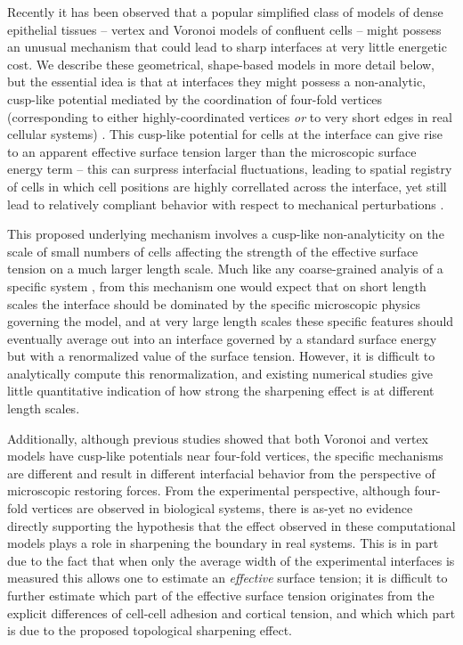 \documentclass[twoside,twocolumn,9pt]{article}
\begin{document}
Recently it has been observed that a popular simplified class of models of dense epithelial tissues  -- vertex and Voronoi models of confluent cells \cite{honda1983geometrical,bi2016motility,alt2017vertex} -- might possess an unusual mechanism that could lead to sharp interfaces at very little energetic cost. We describe these geometrical, shape-based models in more detail below, but the essential idea is that at interfaces they might possess a non-analytic, cusp-like potential mediated by the coordination of four-fold vertices (corresponding to either highly-coordinated vertices \emph{or} to very short edges in real cellular systems) \cite{sussman2018soft}. This cusp-like potential for cells at the interface can give rise to an apparent effective surface tension larger than the microscopic surface energy term -- this can surpress interfacial fluctuations, leading to spatial registry of cells in which cell positions are highly correllated across the interface, yet still lead to relatively compliant behavior with respect to mechanical perturbations \cite{sussman2018soft, sahu2021geometric, lawson2024differences}.

This proposed underlying mechanism involves a cusp-like non-analyticity on the scale of small numbers of cells affecting the strength of the effective surface tension on a much larger length scale. Much like any coarse-grained analyis of a specific system \cite{kardar2007statistical}, from this mechanism one would expect that on short length scales the interface should be dominated by the specific microscopic physics governing the model, and at very large length scales these specific features should eventually average out into an interface governed by a standard surface energy but with a renormalized value of the surface tension. However, it is difficult to analytically compute this renormalization, and existing numerical studies give little quantitative indication of how strong the sharpening effect is at different length scales. 

Additionally, although previous studies showed that both Voronoi and vertex models have cusp-like potentials near four-fold vertices, the specific mechanisms are different and result in different interfacial behavior from the perspective of microscopic restoring forces\cite{lawson2024differences}. From the experimental perspective, although four-fold vertices are observed in biological systems, there is as-yet no evidence directly supporting the hypothesis that the effect observed in these computational  models plays a role in sharpening the boundary in real systems. This is in part due to the fact that when only the average width of the experimental interfaces is measured this allows one to estimate an \emph{effective} surface tension; it is difficult to further estimate which part of the effective surface tension originates from the explicit differences of cell-cell adhesion and cortical tension, and which which part is due to the proposed topological sharpening effect.     
\end{document}
